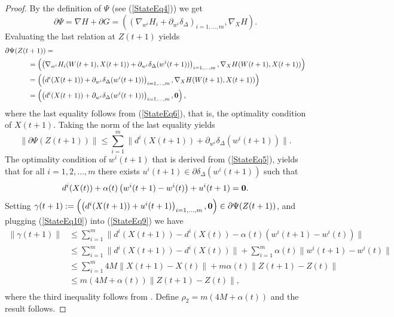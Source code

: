 \documentclass[11pt]{article}
\numberwithin{equation}{section}
\begin{document}
\begin{proof}
By the definition of $\Psi$ (see (\ref{StateEq4})) we get
\begin{equation*}
	\partial \Psi = \nabla H + \partial G  
= \left( \left( \nabla_{w^i} H_i + \partial_{w^i} \delta_{\Delta} \right)_{i=1, \ldots ,m} , \nabla_X H \right) .
\end{equation*}
Evaluating the last relation at $Z(t+1)$ yields
\begin{equation*}
\begin{aligned}
	\partial \Psi(Z(t & + 1)) = \\
	& = \left( \left( \nabla_{w^i} H_i(W(t+1),X(t+1)) + \partial_{w^i} \delta_{\Delta}(w^i(t+1)) \right)_{i=1, \ldots ,m} , \nabla_X H(W(t+1),X(t+1)) \right) \\
	& = \left( \left( d^i(X(t+1)) + \partial_{w^i} \delta_{\Delta}(w^i(t+1)) \right)_{i=1, \ldots ,m} , \nabla_X H(W(t+1),X(t+1)) \right) \\
	& = \left( \left( d^i(X(t+1)) + \partial_{w^i} \delta_{\Delta}(w^i(t+1)) \right)_{i=1, \ldots ,m} , \bf{0} \right) ,
\end{aligned}
\end{equation*}
where the last equality follows from (\ref{StateEq6}), that is, the optimality condition of $X(t+1)$. Taking the norm of the last equality yields
\begin{equation}
	\| \partial \Psi(Z(t+1))\| 
	\leq \sum\limits_{i=1}^{m} \| d^i(X(t+1)) + \partial_{w^i} \delta_{\Delta}(w^i(t+1)) \|. \label{StateEq9}
\end{equation}
The optimality condition of $w^i(t+1)$ that is derived from (\ref{StateEq5}), yields that for all $i=1, 2, \ldots ,m$ there exists $u^i(t+1) \in \partial \delta_{\Delta}(w^i(t+1))$ such that
\begin{equation}
	d^i(X(t)) + \alpha(t) \left( w^i(t+1) - w^i(t) \right) + u^i(t+1) = \bf{0} . \label{StateEq10}
\end{equation}
Setting $\gamma(t+1) := \left( \left( d^i(X(t+1)) + u^i(t+1) \right)_{i=1, \ldots ,m}, \bf{0} \right) \in \partial \Psi(Z(t+1))$, and plugging (\ref{StateEq10}) into (\ref{StateEq9}) we have
\begin{equation*}
\begin{aligned}
	\| \gamma(t+1) \|
	& \leq \sum\limits_{i=1}^{m} \| d^i(X(t+1)) - d^i(X(t)) - \alpha(t) \left( w^i(t+1) - w^i(t) \right) \| \\
	& \leq \sum\limits_{i=1}^{m} \| d^i(X(t+1)) - d^i(X(t)) \| + \sum\limits_{i=1}^{m} \alpha(t) \| w^i(t+1) - w^i(t) \| \\
	& \leq \sum\limits_{i=1}^{m} 4M \| X(t+1) - X(t) \| + m \alpha(t) \|Z(t+1) - Z(t)\| \\
	& \leq m \left( 4M + \alpha(t) \right) \|Z(t+1) - Z(t)\| , \\
\end{aligned}
\end{equation*}
where the third inequality follows from . Define $\rho_2 = m \left( 4M + \alpha(t) \right)$ and the result follows.
\end{proof}
\end{document}
